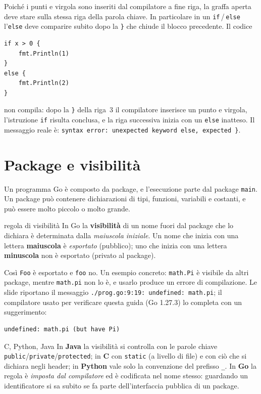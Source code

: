 \documentclass[11pt,a4paper]{report}
\newcommand{\cod}[1]{\texttt{#1}}
\begin{document}
\begin{attenzione}[Errore comune: la graffa \cod{\{} a capo]
Poiché i punti e virgola sono inseriti dal compilatore a fine riga, la graffa
aperta deve stare sulla stessa riga della parola chiave. In particolare in un
\cod{if}\,/\,\cod{else} l'\cod{else} deve comparire subito dopo la \cod{\}} che
chiude il blocco precedente. Il codice
\begin{lstlisting}[style=gocode,numbers=none,frame=none,backgroundcolor={},aboveskip=0.3em,belowskip=0.3em]
if x > 0 {
	fmt.Println(1)
}
else {
	fmt.Println(2)
}
\end{lstlisting}
non compila: dopo la \cod{\}} della riga~3 il compilatore inserisce un
punto e virgola, l'istruzione \cod{if} risulta conclusa, e la riga successiva inizia
con un \cod{else} inatteso. Il messaggio reale è:
\texttt{syntax error: unexpected keyword else, expected \}}.
\end{attenzione}

\section{Package e visibilità}

Un programma Go è composto da package, e l'esecuzione parte dal package
\cod{main}. Un package può contenere dichiarazioni di tipi, funzioni, variabili
e costanti, e può essere molto piccolo o molto grande.

\begin{definizione}{regola di visibilità}
In Go la \textbf{visibilità} di un nome fuori dal package che lo dichiara è
determinata dalla \emph{maiuscola iniziale}. Un nome che inizia con una lettera
\textbf{maiuscola} è \emph{esportato} (pubblico); uno che inizia con una lettera
\textbf{minuscola} non è esportato (privato al package).
\end{definizione}

Così \cod{Foo} è esportato e \cod{foo} no. Un esempio concreto: \cod{math.Pi} è
visibile da altri package, mentre \cod{math.pi} non lo è, e usarlo produce un
errore di compilazione. Le slide riportano il messaggio
\texttt{./prog.go:9:19: undefined: math.pi}; il compilatore usato per
verificare questa guida (Go 1.27.3) lo completa con un suggerimento:

\begin{lstlisting}[style=output]
undefined: math.pi (but have Pi)
\end{lstlisting}

\begin{confronto}{C, Python, Java}
In \textbf{Java} la visibilità si controlla con le parole chiave
\cod{public}/\cod{private}/\cod{protected}; in \textbf{C} con \cod{static} (a
livello di file) e con ciò che si dichiara negli header; in \textbf{Python} vale
solo la convenzione del prefisso \cod{\_}. In \textbf{Go} la regola è
\emph{imposta dal compilatore} ed è codificata nel nome stesso: guardando un
identificatore si sa subito se fa parte dell'interfaccia pubblica di un package.
\end{confronto}
\end{document}
